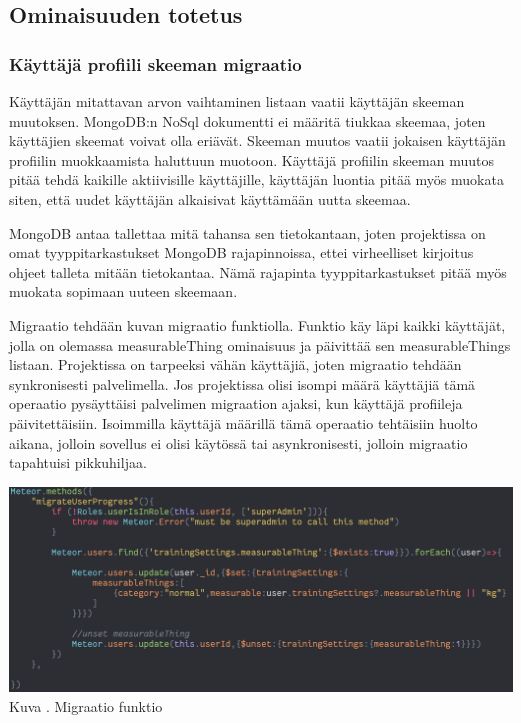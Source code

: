 \subsection{Ominaisuuden totetus}


\subsubsection{Käyttäjä profiili skeeman migraatio}



Käyttäjän mitattavan arvon vaihtaminen listaan vaatii käyttäjän skeeman muutoksen.
MongoDB:n NoSql dokumentti ei määritä tiukkaa skeemaa, joten käyttäjien skeemat voivat olla eriävät.
Skeeman muutos vaatii jokaisen käyttäjän profiilin muokkaamista haluttuun muotoon.
Käyttäjä profiilin skeeman muutos pitää tehdä kaikille aktiivisille käyttäjille, käyttäjän luontia pitää myös muokata siten, 
että uudet käyttäjän alkaisivat käyttämään uutta skeemaa.
\medskip

MongoDB antaa tallettaa mitä tahansa sen tietokantaan, joten projektissa on omat tyyppitarkastukset MongoDB rajapinnoissa, 
ettei virheelliset kirjoitus ohjeet talleta mitään tietokantaa.
Nämä rajapinta tyyppitarkastukset pitää myös muokata sopimaan uuteen skeemaan.
\medskip

Migraatio tehdään kuvan \nextImageCount {} migraatio funktiolla. 
Funktio käy läpi kaikki käyttäjät, jolla on olemassa measurableThing ominaisuus ja päivittää sen measurableThings listaan.
Projektissa on tarpeeksi vähän käyttäjiä, joten migraatio tehdään synkronisesti palvelimella. 
Jos projektissa olisi isompi määrä käyttäjiä tämä operaatio pysäyttäisi palvelimen migraation ajaksi, kun käyttäjä profiileja päivitettäisiin.
Isoimmilla käyttäjä määrillä tämä operaatio tehtäisiin huolto aikana, jolloin sovellus ei olisi käytössä tai asynkronisesti, 
jolloin migraatio tapahtuisi pikkuhiljaa. 
\medskip

\bigskip
\includegraphics[width =15cm]{src/public/oppar/migrationfunction.png}\\
Kuva \getImgCount{}. Migraatio funktio
\medskip







